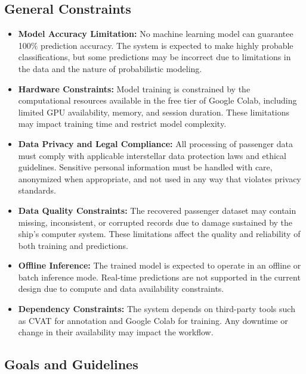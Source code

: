 \documentclass[15pt]{article}
\begin{document}
\subsection{General Constraints}
\begin{itemize}
    \item \textbf{Model Accuracy Limitation:} No machine learning model can guarantee 100\% prediction accuracy. The system is expected to make highly probable classifications, but some predictions may be incorrect due to limitations in the data and the nature of probabilistic modeling.
    
    \item \textbf{Hardware Constraints:} Model training is constrained by the computational resources available in the free tier of Google Colab, including limited GPU availability, memory, and session duration. These limitations may impact training time and restrict model complexity.
    
    \item \textbf{Data Privacy and Legal Compliance:} All processing of passenger data must comply with applicable interstellar data protection laws and ethical guidelines. Sensitive personal information must be handled with care, anonymized when appropriate, and not used in any way that violates privacy standards.
    
    \item \textbf{Data Quality Constraints:} The recovered passenger dataset may contain missing, inconsistent, or corrupted records due to damage sustained by the ship’s computer system. These limitations affect the quality and reliability of both training and predictions.
    
    \item \textbf{Offline Inference:} The trained model is expected to operate in an offline or batch inference mode. Real-time predictions are not supported in the current design due to compute and data availability constraints.
    
    \item \textbf{Dependency Constraints:} The system depends on third-party tools such as CVAT for annotation and Google Colab for training. Any downtime or change in their availability may impact the workflow.
\end{itemize}


\subsection{Goals and Guidelines}
\end{document}
